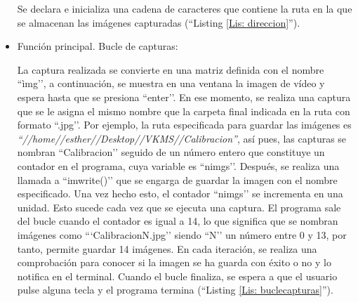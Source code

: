 \begin{itemize}
Se declara e inicializa una cadena de caracteres que contiene la ruta en la que se almacenan las imágenes capturadas (``Listing \ref{Lis: direccion}'').
\clearpage
    \item Función principal. Bucle de capturas: 

    
La captura realizada se convierte en una matriz definida con el nombre ``ìmg’’, a continuación, se muestra en una ventana la imagen de vídeo y espera hasta que se presiona ``enter’’. En ese momento, se realiza una captura que se le asigna el mismo nombre que la carpeta final indicada en la ruta con formato ``.jpg’’. Por ejemplo, la ruta especificada para guardar las imágenes es {\itshape ``//home//esther//Desktop//VKMS//Calibracion''}, así pues, las capturas se nombran ``Calibracion’’ seguido de un número entero que constituye un contador en el programa, cuya variable es ``nimgs’’. Después, se realiza una llamada a ``imwrite()’’ que se engarga de guardar la imagen con el nombre especificado. Una vez hecho esto, el contador ``nimgs’’ se incrementa en una unidad. Esto sucede cada vez que se ejecuta una captura. El programa sale del bucle cuando el contador es igual a 14, lo que significa que se nombran imágenes como ```CalibracionN.jpg’’ siendo ``N’’ un número entre 0 y 13, por tanto, permite guardar 14 imágenes. En cada iteración, se realiza una comprobación para conocer si la imagen se ha guarda con éxito o no y lo notifica en el terminal. Cuando el bucle finaliza, se espera a que el usuario pulse alguna tecla y el programa termina (``Listing \ref{Lis: buclecapturas}'').
    
\end{itemize}



